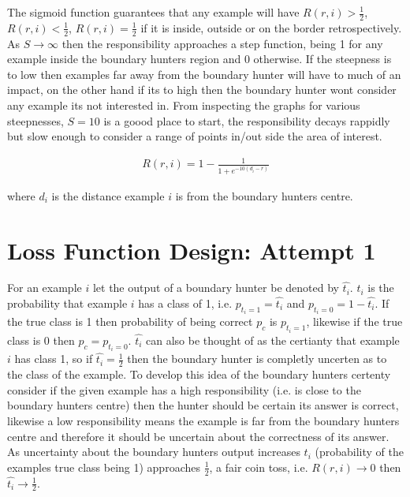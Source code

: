 \documentclass[notitlepage]{report}
\theoremstyle{definition}
\begin{document}
The sigmoid function guarantees that any example will have $R(r, i) > \frac{1}{2}$, $R(r, i) < \frac{1}{2}$, $R(r, i) = \frac{1}{2}$ if it is inside, outside or on the border retrospectively. As $S \rightarrow \infty$ then the responsibility approaches a step function, being 1 for any example inside the boundary hunters region and 0 otherwise. If the steepness is to low then examples far away from the boundary hunter will have to much of an impact, on the other hand if its to high then the boundary hunter wont consider any example its not interested in. From inspecting the graphs for various steepnesses, $S = 10$ is a goood place to start, the responsibility decays rappidly but slow enough to consider a range of points in/out side the area of interest.

\begin{align}
R(r, i) = 1 - \frac{1}{1 + e^{-10(d_i-r)}}
\label{equ:responsibility}
\end{align}

where $d_i$ is the distance example $i$ is from the boundary hunters centre.

\section{Loss Function Design: Attempt 1}
\label{sec:lossfunction-a1}
For an example $i$ let the output of a boundary hunter be denoted by $\widehat{t_i}$. $\widehat{t_i}$ is the probability that example $i$ has a class of 1, i.e. $p_{t_i=1} = \widehat{t_i}$ and $p_{t_i=0} = 1 - \widehat{t_i}$. If the true class is 1 then probability of being correct $p_c$ is $p_{t_i=1}$, likewise if the true class is 0 then $p_c = p_{t_i=0}$. $\widehat{t_i}$ can also be thought of as the certianty that example $i$ has class 1, so if $\widehat{t_i} = \frac{1}{2}$ then the boundary hunter is completly uncerten as to the class of the example. To develop this idea of the boundary hunters certenty consider if the given example has a high responsibility (i.e. is close to the boundary hunters centre) then the hunter should be certain its answer is correct, likewise a low responsibility means the example is far from the boundary hunters centre and therefore it should be uncertain about the correctness of its answer.\\

As uncertainty about the boundary hunters output increases $t_i$ (probability of the examples true class being 1) approaches $\frac{1}{2}$, a fair coin toss, i.e. $R(r, i) \rightarrow 0$ then $\widehat{t_i} \rightarrow \frac{1}{2}$.\\
\end{document}
